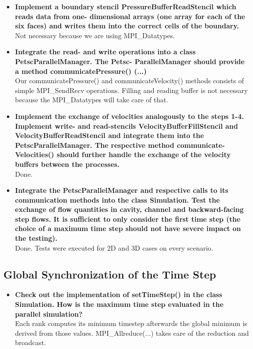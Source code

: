 \documentclass[a4paper]{article}
\begin{document}
\begin{itemize}
	\item \textbf{Implement a boundary stencil PressureBufferReadStencil which reads data from one- dimensional arrays (one array for each of the six faces) and writes them into the correct cells of the boundary.}\\
	Not necessary because we are using MPI\_Datatypes.
	
	\item \textbf{Integrate the read- and write operations into a class PetscParallelManager. The Petsc- ParallelManager should provide a method communicatePressure() (...)}\\
	Our communicatePressure() and communicateVelocity() methods consists of simple MPI\_SendRecv operations. Filling and reading buffer is not necessary because the MPI\_Datatypes will take care of that.
	
	\item \textbf{Implement the exchange of velocities analogously to the steps 1-4. Implement write- and read-stencils VelocityBufferFillStencil and VelocityBufferReadStencil and integrate them into the PetscParallelManager. The respective method communicate- Velocities() should further handle the exchange of the velocity buffers between the processes.}\\
	Done.
	
	\item \textbf{Integrate the PetscParallelManager and respective calls to its communication methods into the class Simulation. Test the exchange of flow quantities in cavity, channel and backward-facing step flows. It is sufficient to only consider the first time step (the choice of a maximum time step should not have severe impact on the testing).}\\
	Done. Tests were executed for 2D and 3D cases on every scenario. 
	
\end{itemize}
\subsection{Global Synchronization of the Time Step}
\begin{itemize}
	\item \textbf{Check out the implementation of setTimeStep() in the class Simulation. How is the maximum time step evaluated in the parallel simulation?}\\
	Each rank computes its minimum timestep afterwards the global minimum is derived from those values. MPI\_Allreduce(...) takes care of the reduction and broadcast.

\end{itemize}
\end{document}
